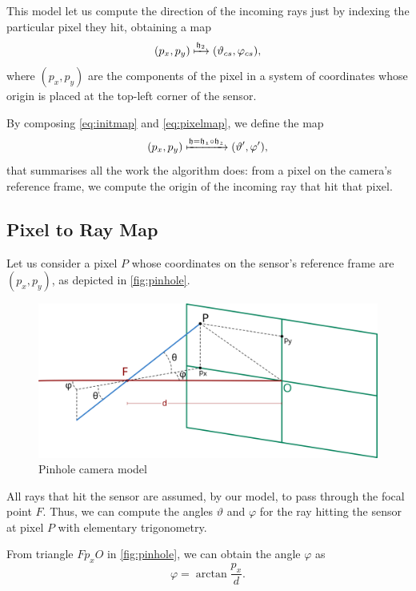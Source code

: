 This model let us compute the direction of the incoming rays just by indexing the particular pixel they hit, obtaining a map
\begin{equation}
	\label{eq:pixelmap}
	(p_x, p_y) \xmapsto{\mathfrak{h}_2} (\vartheta_{cs}, \varphi_{cs}),
\end{equation}
where $(p_x, p_y)$ are the components of the pixel in a system of coordinates whose origin is placed at the top-left corner of the sensor.

By composing \autoref{eq:initmap} and \autoref{eq:pixelmap}, we define the map
\begin{equation}
	(p_x, p_y) \xmapsto{\mathfrak{h} = \mathfrak{h_1}\circ\mathfrak{h_2}} (\vartheta', \varphi'),
\end{equation}
that summarises all the work the algorithm does: from a pixel on the camera's reference frame, we compute the origin of the incoming ray that hit that pixel.

\subsection{Pixel to Ray Map}

Let us consider a pixel $P$ whose coordinates on the sensor's reference frame are $(p_x, p_y)$, as depicted in \autoref{fig:pinhole}.

\begin{figure}[bth]
	\myfloatalign
	\includegraphics[width=.8\linewidth]{gfx/pinhole.png}
	\caption[Pinhole camera model]{Pinhole camera model}
	\label{fig:pinhole}
\end{figure}

All rays that hit the sensor are assumed, by our model, to pass through the focal point $F$. Thus, we can compute the angles $\vartheta$ and $\varphi$ for the ray hitting the sensor at pixel $P$ with elementary trigonometry.

From triangle $Fp_xO$ in \autoref{fig:pinhole}, we can obtain the angle $\varphi$ as
\[
	\varphi = \arctan{\frac{p_x}{d}}.
\]

